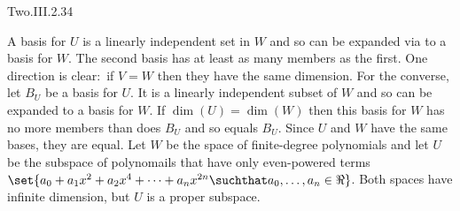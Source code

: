 \begin{ans}{Two.III.2.34}
       \begin{exparts}
          \partsitem A basis for \( U \) is a linearly independent set
            in \( W \)
            and so can be expanded via 
            to a basis for \( W \).
            The second basis has at least as many members as the first.
          \partsitem One direction is clear:~if \( V=W \) then they have the
            same dimension.
            For the converse, let \( B_U \) be a basis for \( U \).
            It is a linearly independent subset of \( W \) and so can be
            expanded to a basis for \( W \).
            If \( \dim(U)=\dim(W) \) then this basis for \( W \) has no more
            members than does \( B_U \) and so equals \( B_U \).
            Since \( U \) and \( W \) have the same bases, they are equal.
          \partsitem Let \( W \) be the space of finite-degree polynomials and
            let \( U \) be the subspace of polynomails that have only
            even-powered terms
            \( \set{a_0+a_1x^2+a_2x^4+\dots+a_nx^{2n}\suchthat
                a_0,\ldots,a_n\in\Re} \).
            Both spaces have infinite dimension, but \( U \) is a proper
            subspace.
       \end{exparts}
     
\end{ans}
